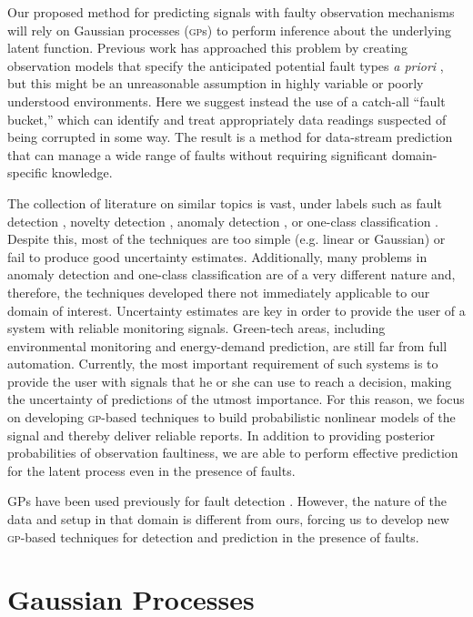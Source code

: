\documentclass{article}
\newcommand{\acro}[1]{\textsc{#1}}
\begin{document}
Our proposed method for predicting signals with faulty observation
mechanisms will rely on Gaussian processes (\acro{gp}s) to perform
inference about the underlying latent function.  Previous work has
approached this problem by creating observation models that specify
the anticipated potential fault types \textit{a priori}
\citep{garnettosborne}, but this might be an unreasonable assumption
in highly variable or poorly understood environments.  Here we suggest instead
the use of a catch-all ``fault bucket,'' which can identify and treat
appropriately data readings suspected of being corrupted in some way.
The result is a method for data-stream prediction that can manage a
wide range of faults without requiring significant
domain-specific knowledge.

The collection of literature on similar topics is vast, under labels
such as fault detection \citep{deFreitas1996, Eciolaza2001,
  Isermann2005, Ding2008}, novelty detection \citep{Markou2003},
anomaly detection \citep{Chandola:2009}, or one-class classification
\citep{Khan2010}. Despite this, most of the techniques are too simple
(e.g. linear or Gaussian) or fail to produce good uncertainty
estimates. Additionally, many problems in anomaly detection and
one-class classification are of a very different nature and,
therefore, the techniques developed there not immediately
applicable to our domain of interest. Uncertainty estimates are key in
order to provide the user of a system with reliable monitoring
signals. Green-tech areas, including environmental monitoring and
energy-demand prediction, are still far from full
automation. Currently, the most important requirement of such systems
is to provide the user with signals that he or she can use to reach a
decision, making the uncertainty of predictions of the utmost
importance. For this reason, we focus on developing \acro{gp}-based
techniques to build probabilistic nonlinear models of the signal and thereby deliver reliable reports.  In addition to
providing posterior probabilities of observation faultiness, we are
able to perform effective prediction for the latent process even in
the presence of faults.

GPs have been used previously for fault detection
\citep{Eciolaza2001}. However, the nature of the data and setup in
that domain is different from ours, forcing us to develop new
\acro{gp}-based techniques for detection and prediction in the
presence of faults.

\section{Gaussian Processes}
\end{document}
